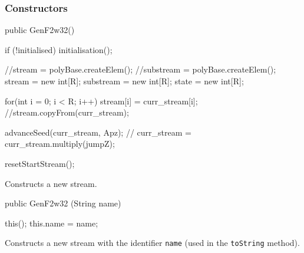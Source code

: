 \begin{code}
\begin{hide}
{{   }

   private void advanceSeed(int[] seed, BitMatrix bm) {
      BitVector bv = new BitVector(seed, 800);

      bv = bm.multiply(bv);

      for(int i = 0; i < R; i++)
         seed[i] = bv.getInt(i);
   }

   private GenF2w32 (int i) {
      //unit vector (to build the state transition matrice)
      state = new int[R];
      for(int j = 0; j < R; j++)
         state[j] = 0;
      state[i / W] = 1 << (i %
      state_i = R - 1;
   }\end{hide}
\end{code}

\subsubsection* {Constructors}

\begin{code}
   public GenF2w32() \begin{hide} {
      if (!initialised)
         initialisation();

      //stream = polyBase.createElem();
      //substream = polyBase.createElem();
      stream = new int[R];
      substream = new int[R];
      state = new int[R];

      for(int i = 0; i < R; i++)
         stream[i] = curr_stream[i];
      //stream.copyFrom(curr_stream);

      advanceSeed(curr_stream, Apz);
      //      curr_stream = curr_stream.multiply(jumpZ);

      resetStartStream();
   } \end{hide}
\end{code}
\begin{tabb} Constructs a new stream.
\end{tabb}
\begin{code}

   public GenF2w32 (String name) \begin{hide} {
      this();
      this.name = name;
   } \end{hide}
\end{code}
\begin{tabb} Constructs a new stream with the identifier \texttt{name}
  (used in the \texttt{toString} method).
\end{tabb}
\begin{htmlonly}
\end{htmlonly}

